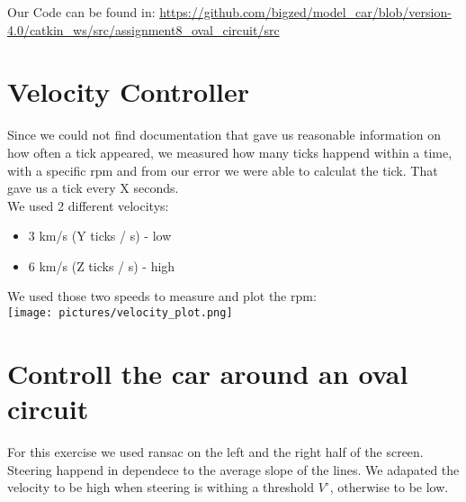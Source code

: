 \documentclass[10pt,oneside,a4paper]{article}
\begin{document}
    Our Code can be found in:
    \url{https://github.com/bigzed/model_car/blob/version-4.0/catkin_ws/src/assignment8_oval_circuit/src}
    \section{Velocity Controller}
        Since we could not find documentation that gave us reasonable
        information on how often a tick appeared, we measured how many ticks
        happend within a time, with a specific rpm and from our error we
        were able to calculat the tick.
        That gave us a tick every X seconds. \\
        We used 2 different velocitys:
        \begin{itemize}
            \item 3 km/s (Y ticks / s) - low
            \item 6 km/s (Z ticks / s) - high
        \end{itemize}

        We used those two speeds to measure and plot the rpm: \\
        \texttt{[image: pictures/velocity\_plot.png]}
    \section{Controll the car around an oval circuit}
        For this exercise we used ransac on the left and the right half of
        the screen. Steering happend in dependece to the average slope of the
        lines. We adapated the velocity to be high when steering is withing a
        threshold $V ^\circ$, otherwise to be low.
\end{document}
